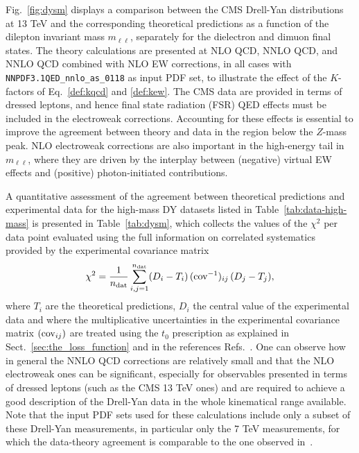\documentclass[withindex,glossary]{cam-thesis}
\begin{document}
Fig.~\ref{fig:dysm} displays a comparison between the CMS Drell-Yan distributions
at 13 TeV and the corresponding theoretical predictions as a function of the
dilepton invariant mass $m_{\ell\ell}$, separately for the dielectron
and dimuon final states.
The theory calculations are presented at NLO QCD, NNLO QCD, and NNLO QCD combined with
NLO EW corrections, in all
cases with {\tt NNPDF3.1QED\_nnlo\_as\_0118} as input PDF set, to illustrate the
effect of the $K$-factors of Eq.~\eqref{def:kqcd} and
\eqref{def:kew}.
%
The CMS data are provided
in terms of dressed leptons, and hence final state radiation (FSR) QED effects must be included in the electroweak
corrections.
%
Accounting for these effects is essential to improve the agreement
between theory and data in the region below the $Z$-mass peak.
%
NLO electroweak corrections are also important in the high-energy tail in $m_{\ell\ell}$,
where they are driven by the interplay between (negative) virtual EW effects
and (positive) photon-initiated contributions.

A quantitative assessment of the agreement between theoretical predictions and experimental 
data for the high-mass DY datasets listed in Table~\ref{tab:data-high-mass}
is presented in Table~\ref{tab:dysm}, which collects the  values of the $\chi^2$ per data point
evaluated using the full information on correlated systematics
provided by the experimental covariance
matrix
\begin{equation}
  \label{eq:chi2}
\chi^2=\frac{1}{n_{\rm dat}}\sum_{i,j=1}^{n_{\rm
    dat}}(D_i-T_i)\,({\rm cov}^{-1})_{ij}\, (D_j-T_j),
\end{equation}
where $T_i$ are the theoretical predictions, $D_i$ the central value
of the experimental data and where the multiplicative uncertainties in
the experimental covariance matrix $({\rm cov}_{ij})$ are treated using the $t_0$ prescription as explained in Sect.~\ref{sec:the_loss_function} and in the references Refs.~\cite{Ball:2009qv,Ball:2012wy}.
%
One can observe how in general the NNLO QCD corrections are relatively
small and that the NLO electroweak
ones can be significant, especially for observables presented 
in terms of dressed leptons (such as the CMS 13 TeV ones) and are required to achieve a good description of the Drell-Yan
data in the whole kinematical range available.
%
Note that the input PDF sets used for these calculations include 
only a subset of these Drell-Yan measurements, in particular only the 7 TeV measurements, 
for which the data-theory agreement is comparable to the one observed in~\cite{Ball:2017nwa}.
\end{document}
